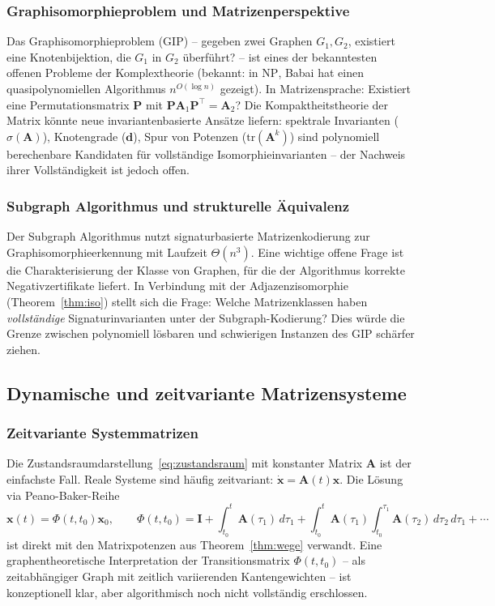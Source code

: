 ﻿\documentclass[12pt, a4paper]{article}
\theoremstyle{definition}
\theoremstyle{remark}
\newcommand{\vx}{\bm{x}}
\newcommand{\vA}{\bm{A}}
\newcommand{\vP}{\bm{P}}
\newcommand{\vI}{\bm{I}}
\newcommand{\T}{\top}
\newcommand{\tr}{\mathrm{tr}}
\newcommand{\spec}{\sigma}
\begin{document}
\subsubsection*{Graphisomorphieproblem und Matrizenperspektive}

Das Graphisomorphieproblem (GIP) -- gegeben zwei Graphen $G_1, G_2$,
existiert eine Knotenbijektion, die $G_1$ in $G_2$ überführt? -- ist
eines der bekanntesten offenen Probleme der Komplextheorie (bekannt: in
$\mathrm{NP}$, Babai \citep{babai2016} hat einen quasipolynomiellen
Algorithmus $n^{O(\log n)}$ gezeigt). In Matrizensprache: Existiert
eine Permutationsmatrix $\vP$ mit $\vP \vA_1 \vP^\T = \vA_2$?
Die Kompaktheitstheorie der Matrix könnte neue invariantenbasierte
Ansätze liefern: spektrale Invarianten ($\spec(\vA)$), Knotengrade
($\bm{d}$), Spur von Potenzen ($\tr(\vA^k)$) sind polynomiell
berechenbare Kandidaten für vollständige Isomorphieinvarianten --
der Nachweis ihrer Vollständigkeit ist jedoch offen.

\subsubsection*{Subgraph Algorithmus und strukturelle Äquivalenz}

Der Subgraph Algorithmus \citep{epp2026subgraph} nutzt signaturbasierte
Matrizenkodierung zur Graphisomorphieerkennung mit Laufzeit
$\Theta(n^3)$. Eine wichtige offene Frage ist die Charakterisierung
der Klasse von Graphen, für die der Algorithmus korrekte
Negativzertifikate liefert. In Verbindung mit der Adjazenzisomorphie
(Theorem~\ref{thm:iso}) stellt sich die Frage: Welche Matrizenklassen
haben \emph{vollständige} Signaturinvarianten unter der Subgraph-Kodierung?
Dies würde die Grenze zwischen polynomiell lösbaren und schwierigen
Instanzen des GIP schärfer ziehen.

\subsection{Dynamische und zeitvariante Matrizensysteme}
\label{subsec:dynamisch}

\subsubsection*{Zeitvariante Systemmatrizen}

Die Zustandsraumdarstellung~\eqref{eq:zustandsraum} mit konstanter Matrix
$\vA$ ist der einfachste Fall. Reale Systeme sind häufig zeitvariant:
$\dot{\vx} = \vA(t)\vx$. Die Lösung via Peano-Baker-Reihe
\[
  \vx(t) = \Phi(t, t_0)\vx_0, \qquad
  \Phi(t,t_0) = \vI + \int_{t_0}^t \vA(\tau_1)\,d\tau_1
    + \int_{t_0}^t \vA(\tau_1)\int_{t_0}^{\tau_1}\vA(\tau_2)\,d\tau_2\,d\tau_1 + \cdots
\]
ist direkt mit den Matrixpotenzen aus Theorem~\ref{thm:wege} verwandt.
Eine graphentheoretische Interpretation der Transitionsmatrix
$\Phi(t,t_0)$ -- als zeitabhängiger Graph mit zeitlich variierenden
Kantengewichten -- ist konzeptionell klar, aber algorithmisch noch
nicht vollständig erschlossen.
\end{document}
